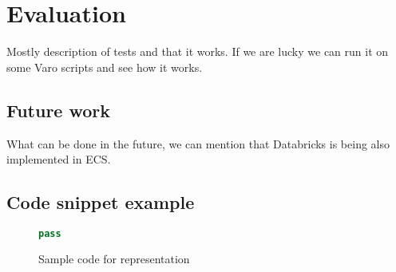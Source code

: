 \chapter{Evaluation}

Mostly description of tests and that it works. If we are lucky we can run it on some Varo scripts and see how it works.

\section{Future work}
What can be done in the future, we can mention that Databricks is being also implemented in ECS.

\section{Code snippet example}

\begin{figure}[h!]
\begin{lstlisting}[language=Python] 
pass
\end{lstlisting}
\caption{Sample code for representation}
\label{fig:sample-transform-code}
\end{figure}

